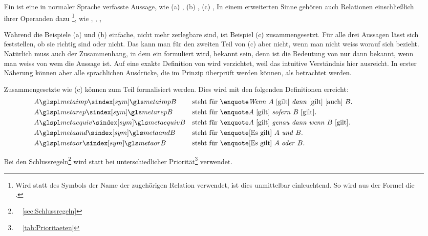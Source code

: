 Ein \emph{} ist eine in normaler Sprache verfasste Aussage, wie \textzB
(a) ,
(b) ,
(c) ,
\textusw
In einem erweiterten Sinne gehören auch Relationen einschließlich ihrer Operanden dazu%
\footnote{%
	Wird statt des Symbols der Name der zugehörigen Relation verwendet, ist dies unmittelbar einleuchtend.
	So wird \textzB aus der Formel  die  .%
},
wie \textzB {}, , , \textusw

Während die Beispiele (a) und (b) einfache, nicht mehr zerlegbare  sind, ist Beispiel (c) zusammengesetzt.
Für alle drei Aussagen lässt sich feststellen, ob sie richtig sind oder nicht.
Das kann man für den zweiten Teil von (c) aber nicht, wenn man nicht weiss worauf sich  bezieht.
Natürlich muss auch der Zusammenhang, in dem ein  formuliert wird, bekannt sein, denn \textzB ist die Bedeutung von  nur dann bekannt, wenn man weiss von wem die Aussage ist.
Auf eine exakte Definition von  wird verzichtet, weil das intuitive Verständnis hier ausreicht.
In erster Näherung können aber alle sprachlichen Ausdrücke, die im Prinzip überprüft werden können, als  betrachtet werden.

Zusammengesetzte  wie (c) können zum Teil formalisiert werden.
Dies wird mit den folgenden Definitionen erreicht:
\begin{align}
	& A \glsSym{metaimp}   B & \text{steht für }
	& \text{\strqt{\emph{Wenn} $A$ [gilt] \emph{dann} [gilt] [auch] $B$}.}
	\\
	& A \glsSym{metarep}   B & \text{steht für }
	& \text{\strqt{$A$ [gilt] \emph{sofern} $B$ [gilt]}.}
	\\
	& A \glsSym{metaequiv} B & \text{steht für }
	& \text{\strqt{$A$ [gilt] \emph{genau dann wenn} $B$ [gilt]}.}
	\\
	& A \glsSym{metaand}   B & \text{steht für }
	& \text{\strqt{[Es gilt] $A$ \emph{und} $B$}.}
	\\
	& A \glsSym{metaor}    B & \text{steht für }
	& \text{\strqt{[Es gilt] $A$ \emph{oder} $B$}.}
	\formulatoleft
\end{align}

Bei den Schlussregeln\footnote{\seename\ \sectionname~\vref{sec:Schlussregeln}} wird \symqt{$\und$} statt \symqt{$\metaund$} bei unterschiedlicher Priorität\footnote{\seename\ \tablename~\vref{tab:Prioritaeten}} verwendet.

